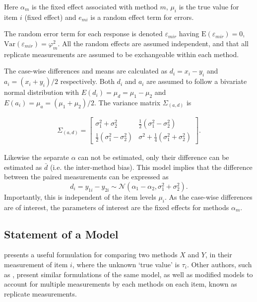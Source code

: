 \documentclass[12pt, a4paper]{report}
\theoremstyle{plain}
\theoremstyle{definition}
\theoremstyle{remark}
\begin{document}
Here $\alpha_m$ is the fixed effect associated with method $m$,
$\mu_i$ is the true value for item $i$ (fixed effect) and $e_{mi}$ is a random effect term for errors.

The random error term for each response is denoted $\varepsilon_{mir}$ having $\mathrm{E}(\varepsilon_{mir})=0$, $\mathrm{Var}(\varepsilon_{mir})=\varphi^2_m$. All the random effects are assumed independent, and that all replicate measurements are assumed to be exchangeable within each method.


The case-wise differences and means are calculated as $d_{i} =
x_{i}-y_{i}$ and $a_{i} = (x_{i}+y_{i})/2$  respectively. Both
$d_{i}$ and $a_{i}$ are assumed to follow a bivariate normal
distribution with $E(d_{i})= \mu_{d} = \mu_{1} - \mu_{2}$ and
$E(a_{i})= \mu_{a} = (\mu_{1} + \mu_{2})/2$. The variance matrix
$\Sigma_{(a,d)}$ is

\begin{eqnarray}
\Sigma_{(a,d)}= \left[\begin{matrix}
\sigma^{2}_{1}+\sigma^{2}_{2}&\frac{1}{2}(\sigma^{2}_{1}-\sigma^{2}_{2})\\
\frac{1}{2}(\sigma^{2}_{1}-\sigma^{2}_{2})&\sigma^{2}+
\frac{1}{4}(\sigma^{2}_{1}+\sigma^{2}_{2})
\end{matrix} \right].
\end{eqnarray}


Likewise the separate $\alpha$ can not be estimated, only their difference can be estimated as $\bar{d}$ (i.e. the inter-method bias). This model implies that the difference between the paired measurements can be expressed as
\[ d_{i} = y_{1i} - y_{2i} \sim \mathcal{N} (\alpha_{1} - \alpha_{2}, \sigma^2_{1} + \sigma^2_{2}). \]
Importantly, this is independent of the item levels $\mu_i$. As the case-wise differences are of interest, the parameters of interest are the fixed effects for methods $\alpha_{m}$.

\subsection{Statement of a Model}
\citet{BXC2010} presents a useful formulation for comparing two methods $X$ and $Y$, in their measurement of item $i$, where the unknown `true value' is $\tau_i$. Other authors, such as \citet{Kinsella}, present similar formulations of the same model, as well as modified models to account for multiple measurements by each methods on each item, known as replicate measurements.
\end{document}
